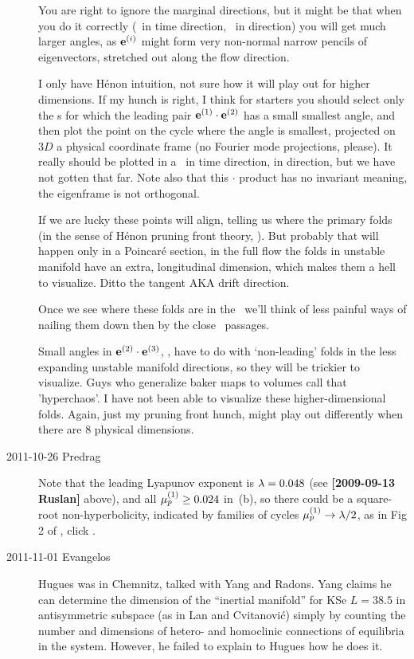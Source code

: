 \begin{description}
You are right to ignore the marginal directions, but it might be that
when you do it correctly (\Poincare\ in time direction, \slice\ in 
direction) you will get much larger angles, as $\jEigvec[i]$ might form
very non-normal narrow pencils of eigenvectors, stretched out along the
flow direction.

I only have H\'enon intuition, not sure how it will play out for higher
dimensions. If my hunch is right, I think for starters you should select
only the \po s for which the leading pair $\jEigvec[1] \cdot \jEigvec[2]$
has a small smallest angle, and then plot the point on the cycle where
the angle is smallest, projected on $3D$ a physical coordinate
frame (no Fourier mode projections, please). It really
should be plotted in a \Poincare\ in time direction, \slice in 
direction, but we have not gotten that far. Note also that this $\cdot$
product has no invariant meaning, the eigenframe is not orthogonal.

If we are lucky these points
will align, telling us where the primary folds (in the sense of H\'enon
pruning front theory, ). But probably that will happen
only in a Poincar\'e section, in the full flow the folds in unstable
manifold have an extra, longitudinal dimension, which makes them a hell
to visualize. Ditto the  tangent AKA drift direction.

Once we see where these folds are in the \statesp\ we'll think of less
painful ways of nailing them down then by the close \po\ passages.

Small angles in $\jEigvec[2] \cdot \jEigvec[3]$, \etc, have to do with
`non-leading' folds in the less expanding unstable manifold directions,
so they will be trickier to visualize. Guys who generalize baker maps to
volumes call that 'hyperchaos'. I have not been able to visualize these
higher-dimensional folds. Again, just my pruning front hunch, might play
out differently when there are 8 physical dimensions.

\item[2011-10-26 Predrag] Note that the leading Lyapunov exponent is
$\Lyap = 0.048$ (see {\bf [2009-09-13 Ruslan]} above), and all
$\eigRe[1]_p \geq 0.024$ in \,(b), so there
could be a square-root non-hyperbolicity, indicated by families of cycles
$\eigRe[1]_p \to \Lyap/2$, as in Fig 2  of , click
.

\item[2011-11-01 Evangelos] Hugues was in Chemnitz, talked with Yang and Radons.
Yang claims he can determine the dimension of the ``inertial manifold'' for
KSe $L=38.5$ in antisymmetric subspace (as in Lan and Cvitanovi\'c)
simply by counting the number and dimensions of hetero- and homoclinic connections of
equilibria in the system. However, he failed to explain to Hugues how he does it.


\end{description}
